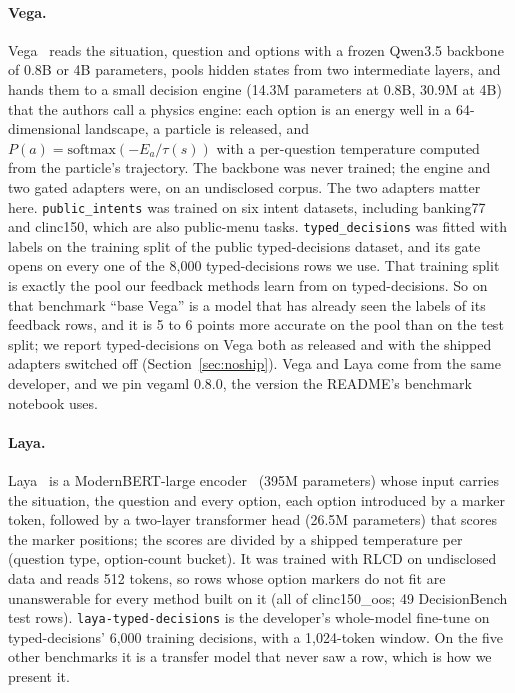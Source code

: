 \documentclass[11pt]{article}
\begin{document}
\paragraph{Vega.}
Vega~\citep{vegaml} reads the situation, question and options with a frozen Qwen3.5 backbone~\citep{qwen3} of 0.8B or 4B parameters, pools hidden states from two intermediate layers, and hands them to a small decision engine (14.3M parameters at 0.8B, 30.9M at 4B) that the authors call a physics engine: each option is an energy well in a 64-dimensional landscape, a particle is released, and $P(a) = \mathrm{softmax}(-E_a/\tau(s))$ with a per-question temperature computed from the particle's trajectory. The backbone was never trained; the engine and two gated adapters were, on an undisclosed corpus. The two adapters matter here. \texttt{public\_intents} was trained on six intent datasets, including banking77 and clinc150, which are also public-menu tasks. \texttt{typed\_decisions} was fitted with labels on the training split of the public typed-decisions dataset, and its gate opens on every one of the 8,000 typed-decisions rows we use. That training split is exactly the pool our feedback methods learn from on typed-decisions. So on that benchmark ``base Vega'' is a model that has already seen the labels of its feedback rows, and it is 5 to 6 points more accurate on the pool than on the test split; we report typed-decisions on Vega both as released and with the shipped adapters switched off (Section~\ref{sec:noship}). Vega and Laya come from the same developer, and we pin vegaml 0.8.0, the version the README's benchmark notebook uses.

\paragraph{Laya.}
Laya~\citep{laya} is a ModernBERT-large encoder~\citep{warner2024modernbert} (395M parameters) whose input carries the situation, the question and every option, each option introduced by a marker token, followed by a two-layer transformer head (26.5M parameters) that scores the marker positions; the scores are divided by a shipped temperature per (question type, option-count bucket). It was trained with RLCD on undisclosed data and reads 512 tokens, so rows whose option markers do not fit are unanswerable for every method built on it (all of clinc150\_oos; 49 DecisionBench test rows). \texttt{laya-typed-decisions} is the developer's whole-model fine-tune on typed-decisions' 6,000 training decisions, with a 1,024-token window. On the five other benchmarks it is a transfer model that never saw a row, which is how we present it.
\end{document}
